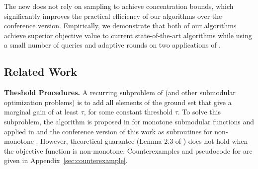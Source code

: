 The new \threseq does not rely on sampling to achieve
concentration bounds, which
significantly
improves the practical efficiency of our algorithms
over the conference version.
Empirically, we demonstrate that both of our algorithms achieve
superior objective value to current state-of-the-art algorithms while using a small
number of queries and adaptive rounds on two applications of \sm. 
\subsection{Related Work}
\label{sec:related_work}
\textbf{Theshold Procedures.}
A recurring subproblem of \sm (and other submodular optimization problems)
is to add all elements of the ground set that give a marginal gain of
at least $\tau$, for some constant threshold $\tau$. 
To solve this subproblem, 
the algorithm \thresam is proposed in 
 for monotone submodular functions
and applied in 
and the conference version of this work \cite{kuhnle2021nearly} as subroutines
for non-monotone \sm. However, theoretical guarantee
(Lemma 2.3 of ) does not hold when the objective
function is non-monotone. Counterexamples and pseudocode for \thresam are given in Appendix~\ref{sec:counterexample}.


